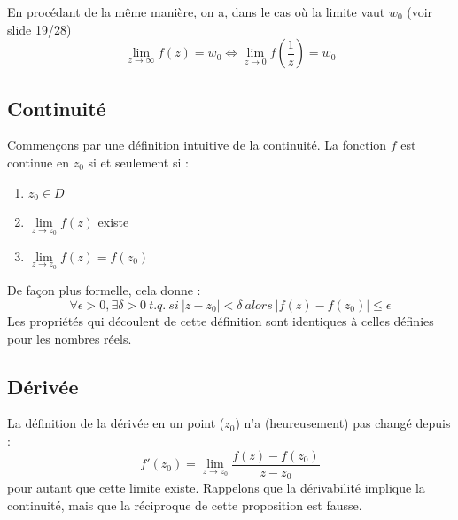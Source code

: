         En procédant de la même manière, on a, dans le cas où la limite
 		vaut $w_0$ (voir slide 19/28) 
 		\begin{equation}
 		\lim \limits _{z \rightarrow \infty} f(z) = w_0 \Leftrightarrow \lim \limits _{z \rightarrow 0} f(\frac{1}{z}) = w_0 
 		\end{equation}

        
        
    \subsection{Continuité}
    Commençons par une définition intuitive de la continuité. La fonction $f$ est continue
    en $z_0$ si et seulement si :
        \begin{enumerate}
        \item $z_0 \in D$
        \item $\lim\limits_{z\rightarrow z_0} f(z)$ existe
        \item $\lim\limits_{z\rightarrow z_0} f(z) = f(z_0)$
        \end{enumerate}
    De façon plus formelle, cela donne :
    \begin{equation}
    \forall \epsilon > 0, \exists \delta > 0\ t.q.\ si\ |z-z_0| < \delta\ alors\ |f(z) - f(z_0)|\leq \epsilon
    \end{equation}
    Les propriétés qui découlent de cette définition sont identiques à celles définies pour les
    nombres réels.
    
    
    \subsection{Dérivée}
    La définition de la dérivée en un point ($z_0$) n'a (heureusement) pas changé depuis :
    \begin{equation}
    f'(z_0) = \lim\limits_{z\rightarrow z_0} \frac{f(z)-f(z_0)}{z-z_0}
    \end{equation}
    pour autant que cette limite existe. Rappelons que la dérivabilité implique la continuité,
    mais que la réciproque de cette proposition est fausse.\\
    
    
